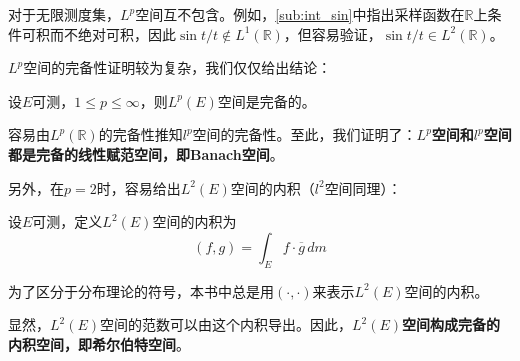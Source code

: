 \documentclass{ctexbook}
\begin{document}
对于无限测度集，$L^p$空间互不包含。例如，\ref{sub:int_sin}中指出采样函数在$\mathbb{R} $上条件可积而不绝对可积，因此$\sin t/t\notin L^1(\mathbb{R} )$，但容易验证，$\sin t/t\in L^2(\mathbb{R} )$。

$L^p$空间的完备性证明较为复杂，我们仅仅给出结论：
\begin{claim}
    设$E$可测，$1\leq p\leq \infty$，则$L^p(E)$空间是完备的。
\end{claim}
容易由$L^p(\mathbb{R} )$的完备性推知$l^p$空间的完备性。至此，我们证明了：\textbf{$L^p$空间和$l^p$空间都是完备的线性赋范空间，即Banach空间}。

另外，在$p=2$时，容易给出$L^2(E)$空间的内积（$l^2$空间同理）：
\begin{definition}[$L^2$空间的内积]
    设$E$可测，定义$L^2(E)$空间的内积为
    \[(f,g)=\int_{E}f\cdot \overline{g}\,dm\]
\end{definition}

为了区分于分布理论的符号，本书中总是用$(\cdot,\cdot)$来表示$L^2(E)$空间的内积。

显然，$L^2(E)$空间的范数可以由这个内积导出。因此，\textbf{$L^2(E)$空间构成完备的内积空间，即希尔伯特空间}。





\end{document}
